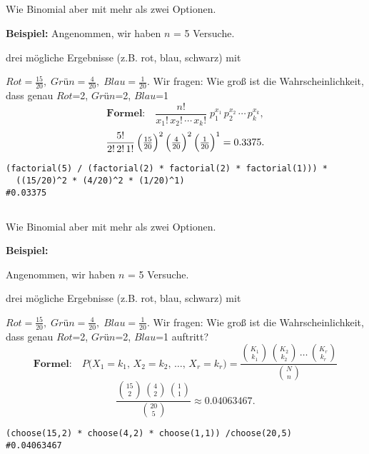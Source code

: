 \subsection*{\centering{}}
\begin{center}
\normalsize
\textcolor{red}{\warning}\textcolor{red}{\warning} Wie Binomial aber mit mehr als zwei Optionen.\textcolor{red}{\warning}\textcolor{red}{\warning}
\end{center}

\textbf{Beispiel:}
Angenommen, wir haben $n$ = 5 Versuche.

drei mögliche Ergebnisse (z.B. rot, blau, schwarz) mit 

$Rot = \frac{15}{20},\;Grün = \frac{4}{20},\;Blau = \frac{1}{20}$.
Wir fragen: Wie groß ist die Wahrscheinlichkeit, dass genau 
$Rot$=2,\; $Grün$=2,\; $Blau$=1
\[
\textbf{Formel:}\quad\frac{n!}{x_1!\,x_2!\,\cdots\,x_k!}\;p_1^{x_1}\,p_2^{x_2}\,\cdots\,p_k^{x_k},
\]
\large{\[
\frac{5!}{2!\,2!\,1!}\,\Bigl(\tfrac{15}{20}\Bigr)^2\,\Bigl(\tfrac{4}{20}\Bigr)^2\,\Bigl(\tfrac{1}{20}\Bigr)^1
= 0.3375.
\]}
\normalsize
\begin{lstlisting}
(factorial(5) / (factorial(2) * factorial(2) * factorial(1))) *
  ((15/20)^2 * (4/20)^2 * (1/20)^1)
#0.03375
\end{lstlisting}
\columnbreak
\subsection*{\centering{}}
\begin{center}
{\centering{}}

\normalsize
\textcolor{red}{\warning}\textcolor{red}{\warning} Wie Binomial aber mit mehr als zwei Optionen. \textcolor{red}{\warning}\textcolor{red}{\warning}
\end{center}


\textbf{Beispiel:}

Angenommen, wir haben $n$ = 5 Versuche.

drei mögliche Ergebnisse (z.B. rot, blau, schwarz) mit 

$Rot = \frac{15}{20},\;Grün = \frac{4}{20},\;Blau = \frac{1}{20}$.
Wir fragen: Wie groß ist die Wahrscheinlichkeit, dass genau 
$Rot$=2,\; $Grün$=2,\; $Blau$=1
auftritt?
\[
\textbf{Formel:}\quad
P\bigl(X_1 = k_1,\,X_2 = k_2,\,\dots,\,X_r = k_r\bigr)
= \frac{\binom{K_1}{k_1}\,\binom{K_2}{k_2}\,\dots\,\binom{K_r}{k_r}}{\binom{N}{n}}
\]
\[
\frac{\binom{15}{2}\,\binom{4}{2}\,\binom{1}{1}}{\binom{20}{5}}
\approx 0.04063467.
\]
\begin{lstlisting}
(choose(15,2) * choose(4,2) * choose(1,1)) /choose(20,5)
#0.04063467
\end{lstlisting}
